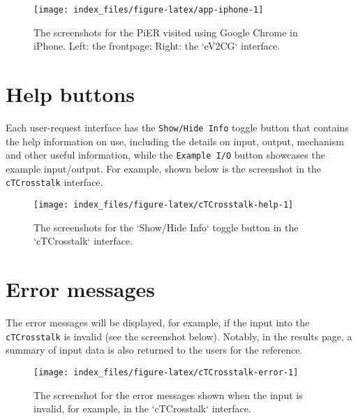 \documentclass[
  oneside]{book}
\begin{document}
\begin{figure}

{\centering \texttt{[image: index\_files/figure-latex/app-iphone-1]} 

}

\caption{The screenshots for the PiER visited using Google Chrome in iPhone. Left: the frontpage; Right: the `eV2CG` interface.}\label{fig:app-iphone}
\end{figure}

\hypertarget{help-buttons}{%
\chapter{Help buttons}\label{help-buttons}}

Each user-request interface has the \texttt{Show/Hide\ Info} toggle button that contains the help information on use, including the details on input, output, mechanism and other useful information, while the \texttt{Example\ I/O} button showcases the example input/output. For example, shown below is the screenshot in the \texttt{cTCrosstalk} interface.

\begin{figure}

{\centering \texttt{[image: index\_files/figure-latex/cTCrosstalk-help-1]} 

}

\caption{The screenshots for the `Show/Hide Info` toggle button in the `cTCrosstalk` interface.}\label{fig:cTCrosstalk-help}
\end{figure}

\hypertarget{error-messages}{%
\chapter{Error messages}\label{error-messages}}

The error messages will be displayed, for example, if the input into the \texttt{cTCrosstalk} is invalid (see the screenshot below). Notably, in the results page, a summary of input data is also returned to the users for the reference.

\begin{figure}

{\centering \texttt{[image: index\_files/figure-latex/cTCrosstalk-error-1]} 

}

\caption{The screenshot for the error messages shown when the input is invalid, for example, in the `cTCrosstalk` interface.}\label{fig:cTCrosstalk-error}
\end{figure}
\end{document}
